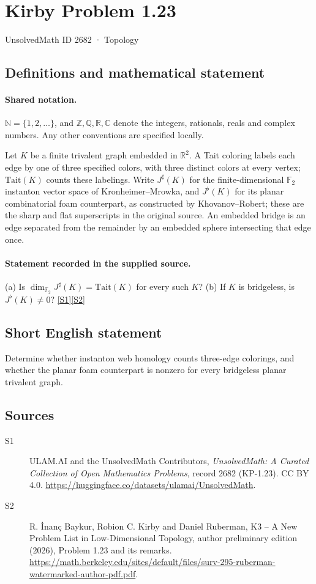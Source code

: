 \documentclass[11pt]{article}
\newcommand{\sref}[2]{\hyperlink{source:#1:#2}{[S#2]}}
\begin{document}
\setcounter{section}{2681}
\section{Kirby Problem 1.23}\label{2682}
{\small\sffamily UnsolvedMath ID 2682 · Topology}
\subsection{Definitions and mathematical statement}

\paragraph{Shared notation.}$\mathbb N=\{1,2,\ldots\}$, and $\mathbb Z,\mathbb Q,\mathbb R,\mathbb C$ denote the integers, rationals, reals and complex numbers. Any other conventions are specified locally.


Let $K$ be a finite trivalent graph embedded in $\mathbb R^2$. A Tait coloring labels each edge by one of three specified colors, with three distinct colors at every vertex; $\mathrm{Tait}(K)$ counts these labelings. Write $J^{\sharp}(K)$ for the finite-dimensional $\mathbb F_2$ instanton vector space of Kronheimer--Mrowka, and $J^{\flat}(K)$ for its planar combinatorial foam counterpart, as constructed by Khovanov--Robert; these are the sharp and flat superscripts in the original source. An embedded bridge is an edge separated from the remainder by an embedded sphere intersecting that edge once.
\paragraph{Statement recorded in the supplied source.}
(a) Is $\dim_{\mathbb F_2}J^{\sharp}(K)=\mathrm{Tait}(K)$ for every such $K$? (b) If $K$ is bridgeless, is $J^{\flat}(K)\ne0$? \sref{2682}{1}\sref{2682}{2}
\subsection{Short English statement}
Determine whether instanton web homology counts three-edge colorings, and whether the planar foam counterpart is nonzero for every bridgeless planar trivalent graph.
\subsection{Sources}
\begin{description}
\item[\hypertarget{source:2682:1}{S1}] ULAM.AI and the UnsolvedMath Contributors, \emph{UnsolvedMath: A Curated Collection of Open Mathematics Problems}, record 2682 (KP-1.23). CC BY 4.0. \url{https://huggingface.co/datasets/ulamai/UnsolvedMath}.
\item[\hypertarget{source:2682:2}{S2}] R. \.{I}nan\c{c} Baykur, Robion C. Kirby and Daniel Ruberman, K3 -- A New Problem List in Low-Dimensional Topology, author preliminary edition (2026), Problem 1.23 and its remarks. \url{https://math.berkeley.edu/sites/default/files/surv-295-ruberman-watermarked-author-pdf.pdf}.
\end{description}
\label{end:2682}
\end{document}
